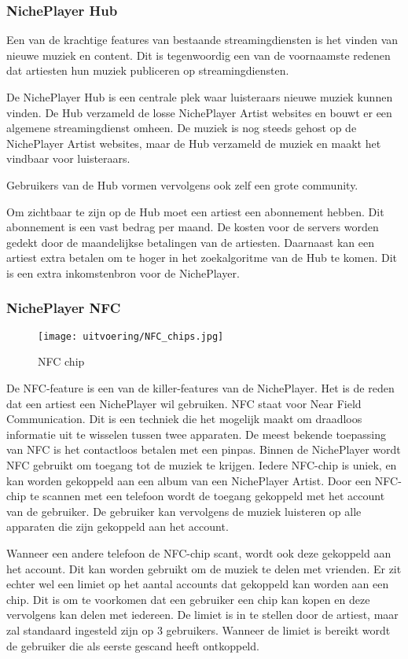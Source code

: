 \subsubsection*{NichePlayer Hub}
Een van de krachtige features van bestaande streamingdiensten is het vinden van nieuwe muziek en content. Dit is tegenwoordig een van de voornaamste redenen dat artiesten hun muziek publiceren op streamingdiensten.

De NichePlayer Hub is een centrale plek waar luisteraars nieuwe muziek kunnen vinden. De Hub verzameld de losse NichePlayer Artist websites en bouwt er een algemene streamingdienst omheen. De muziek is nog steeds gehost op de NichePlayer Artist websites, maar de Hub verzameld de muziek en maakt het vindbaar voor luisteraars.

Gebruikers van de Hub vormen vervolgens ook zelf een grote community. 

Om zichtbaar te zijn op de Hub moet een artiest een abonnement hebben. Dit abonnement is een vast bedrag per maand. De kosten voor de servers worden gedekt door de maandelijkse betalingen van de artiesten. Daarnaast kan een artiest extra betalen om te hoger in het zoekalgoritme van de Hub te komen. Dit is een extra inkomstenbron voor de NichePlayer.

\subsubsection*{NichePlayer NFC}
\begin{wrapfigure}{r}{0.25\textwidth}
  \centering
  \texttt{[image: uitvoering/NFC\_chips.jpg]}
  \caption{NFC chip}
  \label{fig:uitvoering:NFC_chip}
\end{wrapfigure}
De NFC-feature is een van de killer-features van de NichePlayer. Het is de reden dat een artiest een NichePlayer wil gebruiken. NFC staat voor Near Field Communication. Dit is een techniek die het mogelijk maakt om draadloos informatie uit te wisselen tussen twee apparaten. De meest bekende toepassing van NFC is het contactloos betalen met een pinpas. Binnen de NichePlayer wordt NFC gebruikt om toegang tot de muziek te krijgen. Iedere NFC-chip is uniek, en kan worden gekoppeld aan een album van een NichePlayer Artist. Door een NFC-chip te scannen met een telefoon wordt de toegang gekoppeld met het account van de gebruiker. De gebruiker kan vervolgens de muziek luisteren op alle apparaten die zijn gekoppeld aan het account.

Wanneer een andere telefoon de NFC-chip scant, wordt ook deze gekoppeld aan het account. Dit kan worden gebruikt om de muziek te delen met vrienden. Er zit echter wel een limiet op het aantal accounts dat gekoppeld kan worden aan een chip. Dit is om te voorkomen dat een gebruiker een chip kan kopen en deze vervolgens kan delen met iedereen. De limiet is in te stellen door de artiest, maar zal standaard ingesteld zijn op 3 gebruikers. Wanneer de limiet is bereikt wordt de gebruiker die als eerste gescand heeft ontkoppeld.

